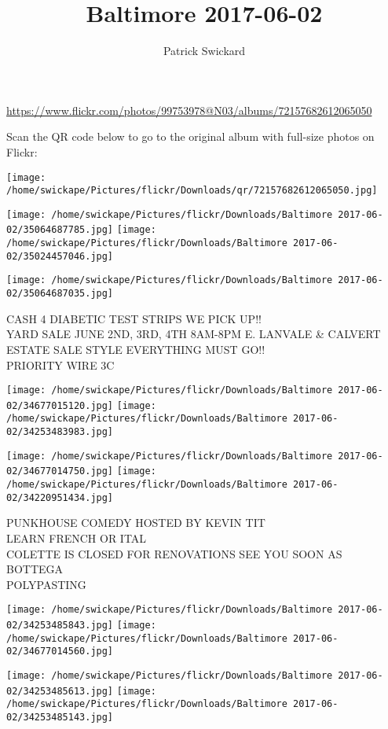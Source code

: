 \documentclass[10pt,letterpaper]{article}
\title{Baltimore 2017-06-02}
\author{Patrick Swickard}
\date{}
\begin{document}
\maketitle

\url{https://www.flickr.com/photos/99753978@N03/albums/72157682612065050}

Scan the QR code below to go to the original album with full-size photos on Flickr:

\texttt{[image: /home/swickape/Pictures/flickr/Downloads/qr/72157682612065050.jpg]}
\pagebreak

\texttt{[image: /home/swickape/Pictures/flickr/Downloads/Baltimore 2017-06-02/35064687785.jpg]}
\texttt{[image: /home/swickape/Pictures/flickr/Downloads/Baltimore 2017-06-02/35024457046.jpg]}

\vspace{0.25in}
\texttt{[image: /home/swickape/Pictures/flickr/Downloads/Baltimore 2017-06-02/35064687035.jpg]}

CASH 4 DIABETIC TEST STRIPS WE PICK UP!!\\
YARD SALE JUNE 2ND, 3RD, 4TH 8AM{-}8PM E. LANVALE \& CALVERT ESTATE SALE STYLE EVERYTHING MUST GO!!\\
PRIORITY WIRE 3C
\pagebreak

\texttt{[image: /home/swickape/Pictures/flickr/Downloads/Baltimore 2017-06-02/34677015120.jpg]}
\texttt{[image: /home/swickape/Pictures/flickr/Downloads/Baltimore 2017-06-02/34253483983.jpg]}

\texttt{[image: /home/swickape/Pictures/flickr/Downloads/Baltimore 2017-06-02/34677014750.jpg]}
\texttt{[image: /home/swickape/Pictures/flickr/Downloads/Baltimore 2017-06-02/34220951434.jpg]}

PUNKHOUSE COMEDY HOSTED BY KEVIN TIT\\
LEARN FRENCH OR ITAL\\
COLETTE IS CLOSED FOR RENOVATIONS SEE YOU SOON AS BOTTEGA\\
POLYPASTING
\pagebreak

\texttt{[image: /home/swickape/Pictures/flickr/Downloads/Baltimore 2017-06-02/34253485843.jpg]}
\texttt{[image: /home/swickape/Pictures/flickr/Downloads/Baltimore 2017-06-02/34677014560.jpg]}

\texttt{[image: /home/swickape/Pictures/flickr/Downloads/Baltimore 2017-06-02/34253485613.jpg]}
\texttt{[image: /home/swickape/Pictures/flickr/Downloads/Baltimore 2017-06-02/34253485143.jpg]}
\end{document}
